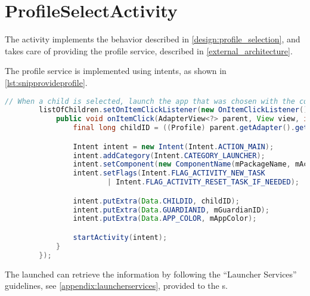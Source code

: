 \section{ProfileSelectActivity}

The  activity implements the behavior described in \autoref{design:profile_selection}, and takes care of providing the profile service, described in \autoref{external_architecture}.

The profile service is implemented using intents, as shown in \autoref{lst:snipprovideprofile}.

\begin{lstlisting}[style=sourceCode, language=JAVA, caption=Code snippet showing the provision of profile data, label=lst:snipprovideprofile]
		// When a child is selected, launch the app that was chosen with the correct data in the extras.
		listOfChildren.setOnItemClickListener(new OnItemClickListener() {
			public void onItemClick(AdapterView<?> parent, View view, int position, long id) {
				final long childID = ((Profile) parent.getAdapter().getItem(position)).getId();

				Intent intent = new Intent(Intent.ACTION_MAIN);
				intent.addCategory(Intent.CATEGORY_LAUNCHER);
				intent.setComponent(new ComponentName(mPackageName, mActivityName));
				intent.setFlags(Intent.FLAG_ACTIVITY_NEW_TASK
						| Intent.FLAG_ACTIVITY_RESET_TASK_IF_NEEDED);

				intent.putExtra(Data.CHILDID, childID);
				intent.putExtra(Data.GUARDIANID, mGuardianID);
				intent.putExtra(Data.APP_COLOR, mAppColor);

				startActivity(intent);
			}
		});
\end{lstlisting}

The launched \girafapp[] can retrieve the information by following the ``Launcher Services'' guidelines, see \autoref{appendix:launcherservices}, provided to the \localgroup[]s.